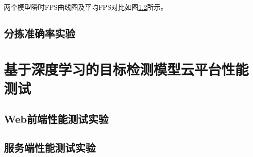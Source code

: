 两个模型瞬时FPS曲线图及平均FPS对比如图\ref{}所示。

\subsection{分拣准确率实验}

\section{基于深度学习的目标检测模型云平台性能测试}

\subsection{Web前端性能测试实验}

\subsection{服务端性能测试实验}

